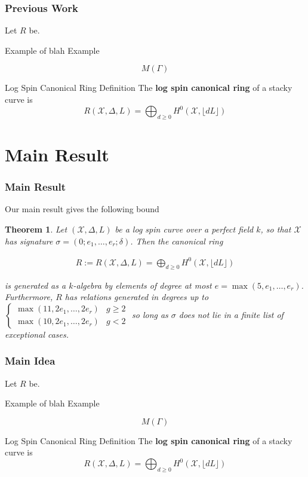 \documentclass{beamer}
\newtheorem{thm}{Theorem}
\theoremstyle{remark}
\newcommand \sx{{\mathscr X}}
\newcommand{\halfcan}{L}
\begin{document}
\begin{frame}
\frametitle{Previous Work}
Let $R$ be.

\pause
\begin{exampleblock}{Example of blah}
Example
\end{exampleblock}

\pause
\[
   M(\Gamma)
\]

\pause
\begin{alertblock}{Log Spin Canonical Ring Definition}
The \textbf{log spin canonical ring} of a stacky curve is
\[
	R(\sx, \Delta, \halfcan) = \bigoplus_{d \geq 0} H^0(\sx, \lfloor d \halfcan \rfloor)
\]
\end{alertblock}

\end{frame}

\section{Main Result}

\begin{frame}
\frametitle{Main Result}
Our main result gives the following bound

\pause
\begin{thm}
\label{thm:main}
Let $(\sx, \Delta, \halfcan)$ be a log spin curve over a perfect field $k$, so
that $\sx$ has signature $\sigma = (0; e_1, \ldots, e_r; \delta)$. Then the
canonical ring

\begin{align*}
	R := R(\sx, \Delta, \halfcan) = \bigoplus_{d \geq 0} H^0(\sx, \lfloor d \halfcan \rfloor)
\end{align*}

\noindent
is generated as a $k$-algebra by elements of degree at most $e =
\max(5, e_1, \ldots, e_r)$. Furthermore, $R$ has relations generated
in degrees up to
$\begin{cases}
	\max(11, 2e_1, \ldots, 2e_r) & g \geq 2 \\
	\max(10, 2e_1, \ldots, 2e_r) & g < 2
\end{cases}$
so long as $\sigma$ does not lie in a finite list of exceptional
cases.
\end{thm}

\end{frame} 

\begin{frame}
\frametitle{Main Idea}
Let $R$ be.

\pause
\begin{exampleblock}{Example of blah}
Example
\end{exampleblock}

\pause
\[
   M(\Gamma)
\]

\pause
\begin{alertblock}{Log Spin Canonical Ring Definition}
The \textbf{log spin canonical ring} of a stacky curve is
\[
	R(\sx, \Delta, \halfcan) = \bigoplus_{d \geq 0} H^0(\sx, \lfloor d \halfcan \rfloor)
\]
\end{alertblock}

\end{frame}
\end{document}
